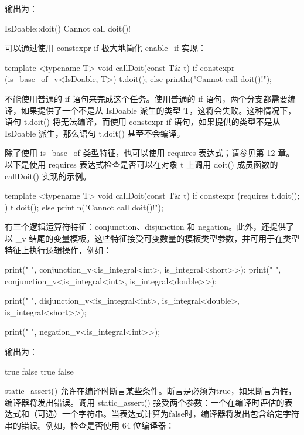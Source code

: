 输出为：

\begin{shell}
IsDoable::doit()
Cannot call doit()!
\end{shell}

可以通过使用 constexpr if 极大地简化 enable\_if 实现：

\begin{cpp}
template <typename T>
void callDoit(const T& t)
{
    if constexpr (is_base_of_v<IsDoable, T>) {
        t.doit();
    } else {
        println("Cannot call doit()!");
    }
}
\end{cpp}

不能使用普通的 if 语句来完成这个任务。使用普通的 if 语句，两个分支都需要编译，如果提供了一个不是从 IsDoable 派生的类型 T，这将会失败。这种情况下，语句 t.doit() 将无法编译，而使用 constexpr if 语句，如果提供的类型不是从 IsDoable 派生，那么语句 t.doit() 甚至不会编译。

除了使用 is\_base\_of 类型特征，也可以使用 requires 表达式；请参见第 12 章。以下是使用 requires 表达式检查是否可以在对象 t 上调用 doit() 成员函数的 callDoit() 实现的示例。

\begin{cpp}
template <typename T>
void callDoit(const T& t)
{
    if constexpr (requires { t.doit(); }) {
        t.doit();
    } else {
        println("Cannot call doit()!");
    }
}
\end{cpp}


有三个逻辑运算符特征：conjunction、disjunction 和 negation。此外，还提供了以 \_v 结尾的变量模板。这些特征接受可变数量的模板类型参数，并可用于在类型特征上执行逻辑操作，例如：

\begin{cpp}
print("{} ", conjunction_v<is_integral<int>, is_integral<short>>);
print("{} ", conjunction_v<is_integral<int>, is_integral<double>>);

print("{} ", disjunction_v<is_integral<int>, is_integral<double>,
                        is_integral<short>>);

print("{} ", negation_v<is_integral<int>>);
\end{cpp}

输出为：

\begin{shell}
true false true false
\end{shell}


static\_assert() 允许在编译时断言某些条件。断言是必须为true，如果断言为假，编译器将发出错误。调用 static\_assert() 接受两个参数：一个在编译时评估的表达式和（可选）一个字符串。当表达式计算为false时，编译器将发出包含给定字符串的错误。例如，检查是否使用 64 位编译器：

